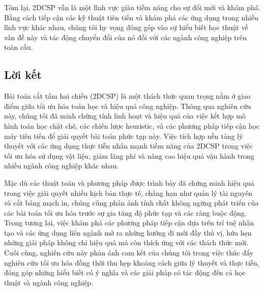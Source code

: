 Tóm lại, 2DCSP vẫn là một lĩnh vực giàu tiềm năng cho sự đổi mới và khám phá. Bằng cách tiếp cận các kỹ thuật tiên tiến và khám phá các ứng dụng trong nhiều lĩnh vực khác nhau, chúng tôi hy vọng đóng góp vào sự hiểu biết học thuật về vấn đề này và tác động chuyển đổi của nó đối với các ngành công nghiệp trên toàn cầu.

\subsection{Lời kết}

Bài toán cắt tấm hai chiều (2DCSP) là một thách thức quan trọng nằm ở giao điểm giữa tối ưu hóa toán học và hiệu quả công nghiệp. Thông qua nghiên cứu này, chúng tôi đã minh chứng tính linh hoạt và hiệu quả của việc kết hợp mô hình toán học chặt chẽ, các chiến lược heuristic, và các phương pháp tiếp cận học máy tiên tiến để giải quyết bài toán phức tạp này. Việc tích hợp nền tảng lý thuyết với các ứng dụng thực tiễn nhấn mạnh tiềm năng của 2DCSP trong việc tối ưu hóa sử dụng vật liệu, giảm lãng phí và nâng cao hiệu quả vận hành trong nhiều ngành công nghiệp khác nhau. 

Mặc dù các thuật toán và phương pháp được trình bày đã chứng minh hiệu quả trong việc giải quyết nhiều kịch bản thực tế, chẳng hạn như quản lý tài nguyên và cắt bảng mạch in, chúng cũng phản ánh tính chất không ngừng phát triển của các bài toán tối ưu hóa trước sự gia tăng độ phức tạp và các ràng buộc động. Trong tương lai, việc khám phá các phương pháp tiếp cận dựa trên trí tuệ nhân tạo và các ứng dụng liên ngành mở ra những hướng đi mới đầy thú vị, hứa hẹn những giải pháp không chỉ hiệu quả mà còn thích ứng với các thách thức mới. Cuối cùng, nghiên cứu này phản ánh cam kết của chúng tôi trong việc thúc đẩy nghiên cứu tối ưu hóa đồng thời thu hẹp khoảng cách giữa lý thuyết và thực tiễn, đóng góp những hiểu biết có ý nghĩa và các giải pháp có tác động đến cả học thuật và ngành công nghiệp.
